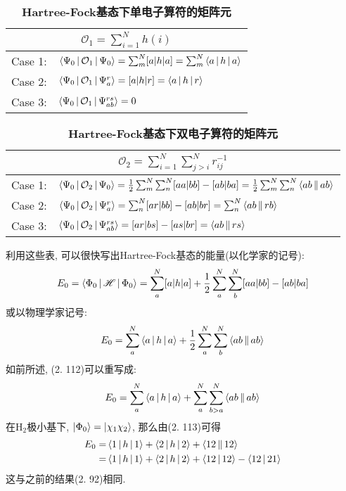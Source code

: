 \begin{table}[h]
	\renewcommand\arraystretch{1.7}
	\centering
	\caption{\bf Hartree-Fock基态下单电子算符的矩阵元}
	\label{t2.5}
	\begin{tabularx}{\textwidth}{lY}
		\hline
		\\\hline
		Case 1: & $\Braket{\Psi_0|\mathcal{O}_1|\Psi_0} = \sum_m^N [a|h|a]=\sum_m^N\Braket{a|h|a}$\\
		Case 2: & $\Braket{\Psi_0|\mathcal{O}_1|\Psi_a^r} = [a|h|r]=\Braket{a|h|r}$\\
		Case 3: & $\Braket{\Psi_0|\mathcal{O}_1|\Psi_{ab}^{rs}} = 0$\\\hline
	\end{tabularx}
\end{table}

\begin{table}[h]
	\renewcommand\arraystretch{1.7}
	\centering
	\caption{\bf Hartree-Fock基态下双电子算符的矩阵元}
	\label{t2.6}
	\begin{tabularx}{\textwidth}{lY}
		\hline
		\\\hline
		Case 1: & $\Braket{\Psi_0|\mathcal{O}_2|\Psi_0} = \frac{1}{2}\sum_m^N\sum_n^N [aa|bb]-[ab|ba]=\frac{1}{2}\sum_m^N\sum_n^N\Braket{ab||ab}$\\
		Case 2: & $\Braket{\Psi_0|\mathcal{O}_2|\Psi_a^r} = \sum_n^N[ar|bb]-[ab|br]=\sum_n^N\Braket{ab||rb}$\\
		Case 3: & $\Braket{\Psi_0|\mathcal{O}_2|\Psi_{ab}^{rs}} = [ar|bs]-[as|br]=\Braket{ab||rs}$\\\hline
	\end{tabularx}
\end{table}

利用这些表, 
可以很快写出Hartree-Fock基态的能量(以化学家的记号):
\begin{equation}
E_0 = \Braket{\Phi_0|\mathscr{H}|\Phi_0} = \sum_{a}^{N}[a|h|a] + \frac{1}{2}\sum_{a}^{N}\sum_{b}^{N}[aa|bb]-[ab|ba]
\end{equation}  
或以物理学家记号:
\begin{equation}
E_0 = \sum_{a}^{N}\Braket{a|h|a} + \frac{1}{2}\sum_{a}^{N}\sum_{b}^{N}\Braket{ab||ab}
\end{equation}
如前所述, 
(2.
112)可以重写成:
\begin{equation}
E_0 = \sum_{a}^{N}\Braket{a|h|a} + \sum_{a}^{N}\sum_{b>a}^{N}\Braket{ab||ab}
\end{equation}
在$\mathrm{H}_2$极小基下, 
$\Ket{\Phi_0}=\Ket{\chi_1\chi_2}$, 
那么由(2.
113)可得
\begin{align}
E_0 =& \Braket{1|h|1} + \Braket{2|h|2} + \Braket{12||12}\notag\\
    =& \Braket{1|h|1} + \Braket{2|h|2} + \Braket{12|12} - \Braket{12|21}
\end{align}
这与之前的结果(2.
92)相同.


